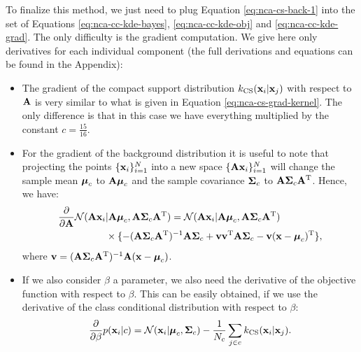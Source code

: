	To finalize this method, we just need to plug Equation \ref{eq:nca-cs-back-1} into
	the set of Equations \ref{eq:nca-cc-kde-bayes}, \ref{eq:nca-cc-kde-obj} and
	\ref{eq:nca-cc-kde-grad}. The only difficulty is the gradient computation. We give here only derivatives for each individual component (the full derivations and equations can be found in the Appendix):
	\begin{itemize}
		\item The gradient of the compact support distribution $k_\text{CS}(\mathbf{x}_i|\mathbf{x}_j)$ with respect to $\mathbf{A}$ is very similar to what is given in Equation \ref{eq:nca-cs-grad-kernel}. The only difference is that in this case we have everything multiplied by the constant $c=\frac{15}{16}$.
		\item For the gradient of the background distribution it is useful to note that projecting the points $\{\mathbf{x}_i\}_{i=1}^N$
	into a new space $\{\mathbf{A}\mathbf{x}_i\}_{i=1}^N$ will change the sample mean $\mbox{\boldmath $\mu$}_c$ to
	$\mathbf{A}\mbox{\boldmath $\mu$}_c$ and the sample covariance $\mbox{\boldmath $\Sigma$}_c$ to
	$\mathbf{A}\mbox{\boldmath $\Sigma$}_c\mathbf{A}^\mathrm{T}$. Hence, we have:
		\begin{align}
			\frac{\partial}{\partial \mathbf{A}} \mathcal{N}(\mathbf{A}\mathbf{x}_i&|\mathbf{A}\mbox{\boldmath $\mu$}_c, \mathbf{A}\mbox{\boldmath $\Sigma$}_c
	\mathbf{A}^\mathrm{T}) = \mathcal{N}(\mathbf{A}\mathbf{x}_i|\mathbf{A}\mbox{\boldmath $\mu$}_c, \mathbf{A}\mbox{\boldmath $\Sigma$}_c
	\mathbf{A}^\mathrm{T})\notag\\
			&\times \{ -(\mathbf{A}\mbox{\boldmath $\Sigma$}_c \mathbf{A}^\mathrm{T})^{-1}\mathbf{A}\mbox{\boldmath $\Sigma$}_c
			+\mathbf{v} \mathbf{v} ^ \mathrm{T} \mathbf{A} \mbox{\boldmath $\Sigma$}_c - \mathbf{v} (\mathbf{x} - \mbox{\boldmath $\mu$}_c)^\mathrm{T}
			\},
		\end{align}
		where $\mathbf{v} = (\mathbf{A}\mbox{\boldmath $\Sigma$}_c \mathbf{A}^\mathrm{T})^{-1}\mathbf{A}(\mathbf{x} - \mbox{\boldmath $\mu$}_c)$.
		\item If we also consider $\beta$ a parameter, we also need the derivative of the objective function with respect to $\beta$. This can be easily obtained, if we use the derivative of the class conditional distribution with respect to $\beta$:
		\begin{align}
			\frac{\partial}{\partial\beta} p(\mathbf{x}_i|c) 
			=  \mathcal{N}(\mathbf{x}_i|\mbox{\boldmath $\mu$}_c,\mbox{\boldmath $\Sigma$}_c) -
				\frac{1}{N_c}\sum_{j\in c} k_\text{CS}(\mathbf{x}_i|\mathbf{x}_j).
		\end{align}
		
	\end{itemize}

